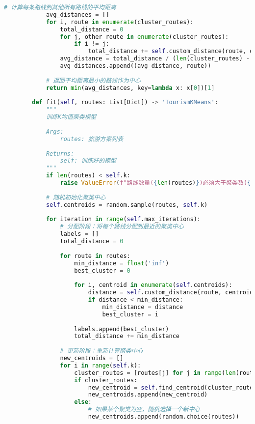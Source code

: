 \begin{lstlisting}[language=Python]
            # 计算每条路线到其他所有路线的平均距离
            avg_distances = []
            for i, route in enumerate(cluster_routes):
                total_distance = 0
                for j, other_route in enumerate(cluster_routes):
                    if i != j:
                        total_distance += self.custom_distance(route, other_route)
                avg_distance = total_distance / (len(cluster_routes) - 1)
                avg_distances.append((avg_distance, route))
            
            # 返回平均距离最小的路线作为中心
            return min(avg_distances, key=lambda x: x[0])[1]
        
        def fit(self, routes: List[Dict]) -> 'TourismKMeans':
            """
            训练K均值聚类模型
            
            Args:
                routes: 旅游方案列表
                
            Returns:
                self: 训练好的模型
            """
            if len(routes) < self.k:
                raise ValueError(f"路线数量({len(routes)})必须大于聚类数({self.k})")
            
            # 随机初始化聚类中心
            self.centroids = random.sample(routes, self.k)
            
            for iteration in range(self.max_iterations):
                # 分配阶段：将每个路线分配到最近的聚类中心
                labels = []
                total_distance = 0
                
                for route in routes:
                    min_distance = float('inf')
                    best_cluster = 0
                    
                    for i, centroid in enumerate(self.centroids):
                        distance = self.custom_distance(route, centroid)
                        if distance < min_distance:
                            min_distance = distance
                            best_cluster = i
                    
                    labels.append(best_cluster)
                    total_distance += min_distance
                
                # 更新阶段：重新计算聚类中心
                new_centroids = []
                for i in range(self.k):
                    cluster_routes = [routes[j] for j in range(len(routes)) if labels[j] == i]
                    if cluster_routes:
                        new_centroid = self.find_centroid(cluster_routes)
                        new_centroids.append(new_centroid)
                    else:
                        # 如果某个聚类为空，随机选择一个新中心
                        new_centroids.append(random.choice(routes))
                

\end{lstlisting}
